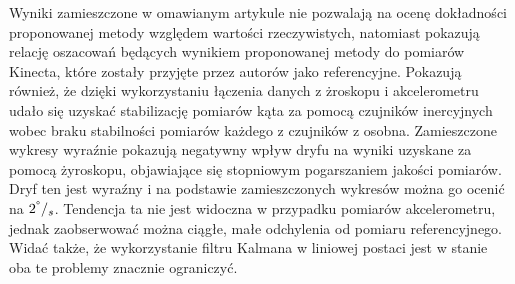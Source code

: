 	Wyniki zamieszczone w omawianym artykule \cite{Bo2011a} nie pozwalają na ocenę dokładności proponowanej metody względem wartości rzeczywistych, natomiast pokazują relację oszacowań będących wynikiem proponowanej metody do pomiarów Kinecta, które zostały przyjęte przez autorów jako referencyjne. Pokazują również, że dzięki wykorzystaniu łączenia danych z żroskopu i akcelerometru udało się uzyskać stabilizację pomiarów kąta za pomocą czujników inercyjnych wobec braku stabilności pomiarów każdego z czujników z osobna. Zamieszczone wykresy wyraźnie pokazują negatywny wpływ dryfu na wyniki uzyskane za pomocą żyroskopu, objawiające się stopniowym pogarszaniem jakości pomiarów. Dryf ten jest wyraźny i na podstawie zamieszczonych wykresów można go ocenić na $2^\degree/_s$. Tendencja ta nie jest widoczna w przypadku pomiarów akcelerometru, jednak zaobserwować można ciągłe, małe odchylenia od pomiaru referencyjnego. Widać także, że wykorzystanie filtru Kalmana w liniowej postaci jest w stanie oba te problemy znacznie ograniczyć.\\
		
